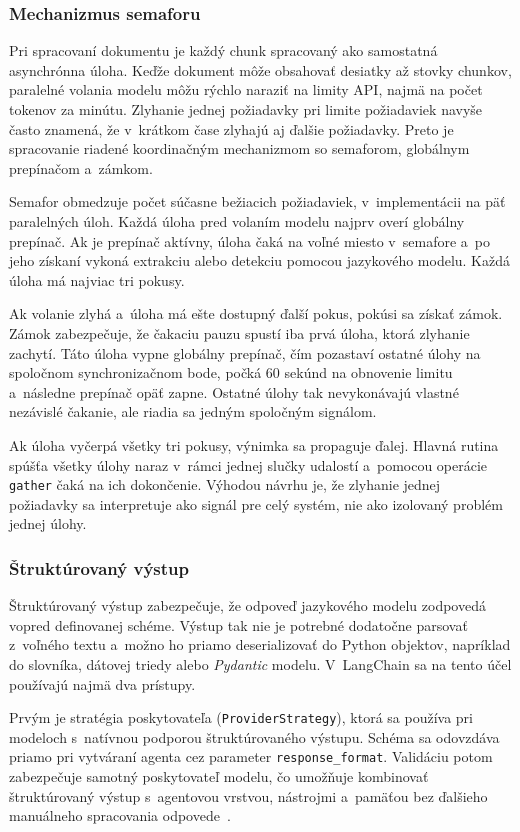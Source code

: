 \subsubsection{Mechanizmus semaforu}

Pri spracovaní dokumentu je každý chunk spracovaný ako samostatná asynchrónna úloha. Keďže dokument môže obsahovať desiatky až stovky chunkov, paralelné volania modelu môžu rýchlo naraziť na limity API, najmä na počet tokenov za minútu. Zlyhanie jednej požiadavky pri limite požiadaviek navyše často znamená, že v~krátkom čase zlyhajú aj ďalšie požiadavky. Preto je spracovanie riadené koordinačným mechanizmom so semaforom, globálnym prepínačom a~zámkom.

Semafor obmedzuje počet súčasne bežiacich požiadaviek, v~implementácii na päť paralelných úloh. Každá úloha pred volaním modelu najprv overí globálny prepínač. Ak je prepínač aktívny, úloha čaká na voľné miesto v~semafore a~po jeho získaní vykoná extrakciu alebo detekciu pomocou jazykového modelu. Každá úloha má najviac tri pokusy.

Ak volanie zlyhá a~úloha má ešte dostupný ďalší pokus, pokúsi sa získať zámok. Zámok zabezpečuje, že čakaciu pauzu spustí iba prvá úloha, ktorá zlyhanie zachytí. Táto úloha vypne globálny prepínač, čím pozastaví ostatné úlohy na spoločnom synchronizačnom bode, počká 60 sekúnd na obnovenie limitu a~následne prepínač opäť zapne. Ostatné úlohy tak nevykonávajú vlastné nezávislé čakanie, ale riadia sa jedným spoločným signálom.

Ak úloha vyčerpá všetky tri pokusy, výnimka sa propaguje ďalej. Hlavná rutina spúšťa všetky úlohy naraz v~rámci jednej slučky udalostí a~pomocou operácie \texttt{gather} čaká na ich dokončenie. Výhodou návrhu je, že zlyhanie jednej požiadavky sa interpretuje ako signál pre celý systém, nie ako izolovaný problém jednej úlohy.


\subsubsection{Štruktúrovaný výstup}

Štruktúrovaný výstup zabezpečuje, že odpoveď jazykového modelu zodpovedá vopred definovanej schéme. Výstup tak nie je potrebné dodatočne parsovať z~voľného textu a~možno ho priamo deserializovať do Python objektov, napríklad do slovníka, dátovej triedy alebo \textit{Pydantic} modelu. V~LangChain sa na tento účel používajú najmä dva prístupy.

Prvým je stratégia poskytovateľa (\texttt{ProviderStrategy}), ktorá sa používa pri modeloch s~natívnou podporou štruktúrovaného výstupu. Schéma sa odovzdáva priamo pri vytváraní agenta cez parameter \texttt{response\_format}. Validáciu potom zabezpečuje samotný poskytovateľ modelu, čo umožňuje kombinovať štruktúrovaný výstup s~agentovou vrstvou, nástrojmi a~pamäťou bez ďalšieho manuálneho spracovania odpovede~\cite{langchainStructuredOutput}.

